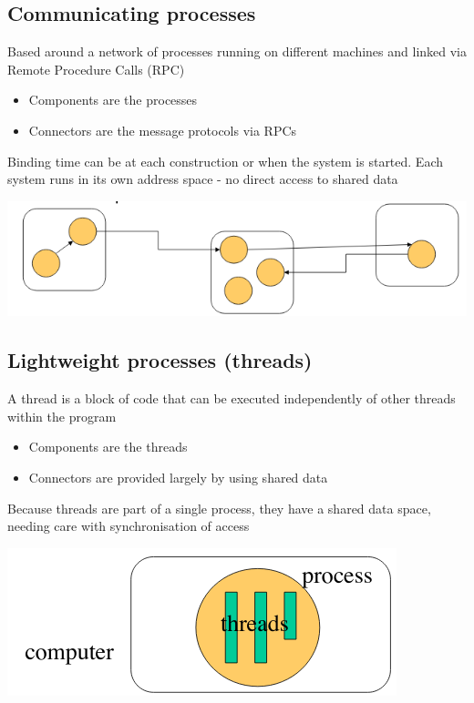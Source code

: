 \documentclass{article}[18pt]
\begin{document}
\subsection{Communicating processes}
Based around a network of processes running on different machines and linked via Remote Procedure Calls (RPC)
\begin{itemize}
	\item Components are the processes
	\item Connectors are the message protocols via RPCs
\end{itemize}
Binding time can be at each construction or when the system is started. Each system runs in its own address space - no direct access to shared data
\begin{center}
	\includegraphics[scale=0.7]{"Communicating Processes"}
\end{center}
\subsection{Lightweight processes (threads)}
A thread is a block of code that can be executed independently of other threads within the program
\begin{itemize}
	\item Components are the threads
	\item Connectors are provided largely by using shared data
\end{itemize}
Because threads are part of a single process, they have a shared data space, needing care with synchronisation of access
\begin{center}
	\includegraphics[scale=0.7]{Threads}
\end{center}
\end{document}
